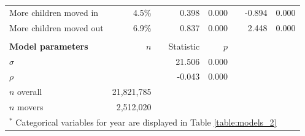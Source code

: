 \begin{table}[H]
\begin{tabular}{lrrrrrrr}
		\hspace{2mm} More children moved in                         & 4.5\%   &  & 0.398                    & 0.000                 &                      & -0.894                   & 0.000                 \\
		\hspace{2mm} More children moved out                        & 6.9\%   &  & 0.837                    & 0.000                 &                      & 2.448                    & 0.000                 \\ \hline
		&         &  &                          &                       &                      &                          &                       \\
		\textbf{Model parameters}                  &   $n$   &    & Statistic & $p$                          &                                            &                          &                       \\ \hline
		$\sigma$                                     &         &  & 21.506                   & 0.000                 &                      &                          &                       \\
		$\rho$                                       &         &  & -0.043                   & 0.000                 &                      &                          &                       \\
		$n$ overall                             &           21,821,785  &  &              &                       &                      &                          &                       \\
		$n$ movers                               &            2,512,020 &  &               &                       &                      &                          &       \\ \hline          
		\multicolumn{8}{p{12.2cm}}{\small{$^*$ Categorical variables for year are displayed in Table \ref{table:models_2}}}\\
		
	\end{tabular}
	
\end{table}




